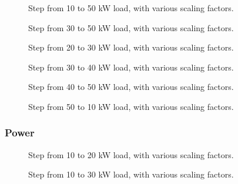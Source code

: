 \begin{figure}[H]
\centering

\caption{Step from 10 to 50 kW load, with various scaling factors.}
\label{fig:test11-14-10to50kwstepfreq}
\end{figure}

\begin{figure}[H]
\centering

\caption{Step from 30 to 50 kW load, with various scaling factors.}
\label{fig:test11-14-30to50kwstepfreq}
\end{figure}

\begin{figure}[H]
\centering

\caption{Step from 20 to 30 kW load, with various scaling factors.}
\label{fig:test11-14-20to30kwstepfreq}
\end{figure}

\begin{figure}[H]
\centering

\caption{Step from 30 to 40 kW load, with various scaling factors.}
\label{fig:test11-14-30to40kwstepfreq}
\end{figure}

\begin{figure}[H]
\centering

\caption{Step from 40 to 50 kW load, with various scaling factors.}
\label{fig:test11-14-40to50kwstepfreq}
\end{figure}

\begin{figure}[H]
\centering

\caption{Step from 50 to 10 kW load, with various scaling factors.}
\label{fig:test11-14-50to10kwstepfreq}
\end{figure}

\subsubsection{Power}

\begin{figure}[H]
\centering

\caption{Step from 10 to 20 kW load, with various scaling factors.}
\label{fig:test11-14-10to20kwsteppower}
\end{figure}

\begin{figure}[H]
\centering

\caption{Step from 10 to 30 kW load, with various scaling factors.}
\label{fig:test11-14-10to30kwsteppower}
\end{figure}

